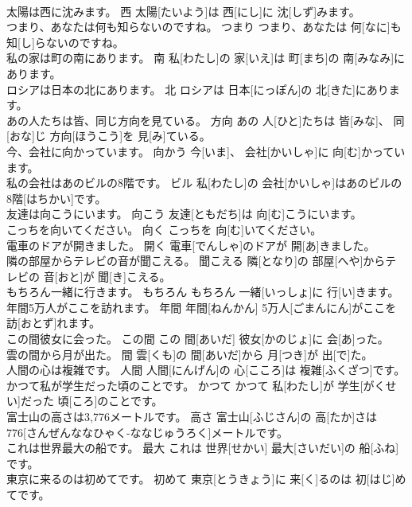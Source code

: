 \documentclass[8pt]{extreport}
\begin{document}
\begin{CJK}{UTF8}{min}
\\	太陽は西に沈みます。	西	太陽[たいよう]は 西[にし]に 沈[しず]みます。	
\\	つまり、あなたは何も知らないのですね。	つまり	つまり、あなたは 何[なに]も 知[し]らないのですね。	
\\	私の家は町の南にあります。	南	私[わたし]の 家[いえ]は 町[まち]の 南[みなみ]にあります。	
\\	ロシアは日本の北にあります。	北	ロシアは 日本[にっぽん]の 北[きた]にあります。	
\\	あの人たちは皆、同じ方向を見ている。	方向	あの 人[ひと]たちは 皆[みな]、 同[おな]じ 方向[ほうこう]を 見[み]ている。	
\\	今、会社に向かっています。	向かう	今[いま]、 会社[かいしゃ]に 向[む]かっています。	
\\	私の会社はあのビルの8階です。	ビル	私[わたし]の 会社[かいしゃ]はあのビルの 8階[はちかい]です。	
\\	友達は向こうにいます。	向こう	友達[ともだち]は 向[む]こうにいます。	
\\	こっちを向いてください。	向く	こっちを 向[む]いてください。	
\\	電車のドアが開きました。	開く	電車[でんしゃ]のドアが 開[あ]きました。	
\\	隣の部屋からテレビの音が聞こえる。	聞こえる	隣[となり]の 部屋[へや]からテレビの 音[おと]が 聞[き]こえる。	
\\	もちろん一緒に行きます。	もちろん	もちろん 一緒[いっしょ]に 行[い]きます。	
\\	年間5万人がここを訪れます。	年間	年間[ねんかん] 5万人[ごまんにん]がここを 訪[おとず]れます。	
\\	この間彼女に会った。	この間	この 間[あいだ] 彼女[かのじょ]に 会[あ]った。	
\\	雲の間から月が出た。	間	雲[くも]の 間[あいだ]から 月[つき]が 出[で]た。	
\\	人間の心は複雑です。	人間	人間[にんげん]の 心[こころ]は 複雑[ふくざつ]です。	
\\	かつて私が学生だった頃のことです。	かつて	かつて 私[わたし]が 学生[がくせい]だった 頃[ころ]のことです。	
\\	富士山の高さは3,776メートルです。	高さ	富士山[ふじさん]の 高[たか]さは 
\\	776[さんぜんななひゃく-ななじゅうろく]メートルです。	
\\	これは世界最大の船です。	最大	これは 世界[せかい] 最大[さいだい]の 船[ふね]です。	
\\	東京に来るのは初めてです。	初めて	東京[とうきょう]に 来[く]るのは 初[はじ]めてです。	

\end{CJK}
\end{document}
